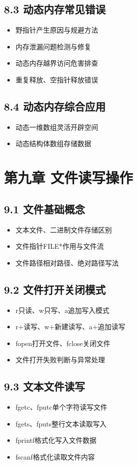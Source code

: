 \subsection{8.3 动态内存常见错误}
\begin{itemize}
\item 野指针产生原因与规避方法
\item 内存泄漏问题检测与修复
\item 动态内存越界访问危害排查
\item 重复释放、空指针释放错误
\end{itemize}

\subsection{8.4 动态内存综合应用}
\begin{itemize}
\item 动态一维数组灵活开辟空间
\item 动态结构体数组存储数据
\end{itemize}

\section{第九章 文件读写操作}
\subsection{9.1 文件基础概念}
\begin{itemize}
\item 文本文件、二进制文件存储区别
\item 文件指针FILE*作用与文件流
\item 文件路径相对路径、绝对路径写法
\end{itemize}

\subsection{9.2 文件打开关闭模式}
\begin{itemize}
\item r只读、w只写、a追加写入模式
\item r+读写、w+新建读写、a+追加读写
\item fopen打开文件、fclose关闭文件
\item 文件打开失败判断与异常处理
\end{itemize}

\subsection{9.3 文本文件读写}
\begin{itemize}
\item fgetc、fputc单个字符读写文件
\item fgets、fputs整行文本读取写入
\item fprintf格式化写入文件数据
\item fscanf格式化读取文件内容
\end{itemize}

